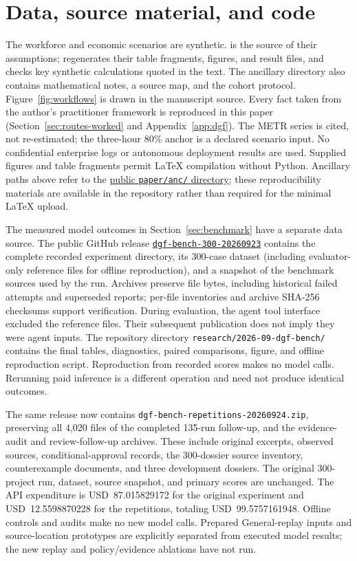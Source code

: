 \section*{Data, source material, and code}

The workforce and economic scenarios are synthetic.  is the source of their assumptions;
 regenerates their table fragments, figures, and result files, and
 checks key synthetic calculations quoted in the text. The ancillary directory also contains
mathematical notes, a source map, and the cohort protocol. Figure~\ref{fig:workflows} is drawn in the
manuscript source. Every fact taken from the author's practitioner framework is reproduced in this paper
(Section~\ref{sec:routes-worked} and Appendix~\ref{app:dgf}). The METR series is cited, not re-estimated; the three-hour 80\% anchor is a declared scenario
input. No confidential enterprise logs or autonomous deployment results are used. Supplied figures and
table fragments permit \LaTeX{} compilation without Python.
Ancillary paths above refer to the
\href{https://github.com/jeremy1392/dgf-agentic-bench/tree/main/paper/anc}{public \texttt{paper/anc/} directory}; these reproducibility
materials are available in the repository rather than required for the minimal \LaTeX{} upload.

The measured model outcomes in Section~\ref{sec:benchmark} have a separate data source.
The public GitHub release
\href{https://github.com/jeremy1392/dgf-agentic-bench/releases/tag/dgf-bench-300-20260923}{\texttt{dgf-bench-300-20260923}}
contains the complete recorded experiment directory, its 300-case dataset (including evaluator-only
reference files for offline reproduction), and a snapshot of the benchmark sources used by the run.
Archives preserve file bytes, including historical failed attempts and superseded reports; per-file
inventories and archive SHA-256 checksums support verification. During evaluation, the agent tool
interface excluded the reference files. Their subsequent publication does not imply they were agent inputs.
The repository directory \nolinkurl{research/2026-09-dgf-bench/} contains the final tables, diagnostics,
paired comparisons, figure, and offline reproduction script. Reproduction from recorded scores makes
no model calls. Rerunning paid inference is a different operation and need not produce identical outcomes.

The same release now contains \texttt{dgf-bench-repetitions-20260924.zip}, preserving all
4,020 files of the completed 135-run follow-up, and the evidence-audit and review-follow-up
archives. These include original excerpts, observed sources, conditional-approval records,
the 300-dossier source inventory, counterexample documents, and three development dossiers.
The original 300-project run, dataset, source snapshot, and primary scores are unchanged.
The API expenditure is USD~87.015829172 for the original experiment and USD~12.5598870228 for
the repetitions, totaling USD~99.5757161948. Offline controls and audits make no new model calls.
Prepared General-replay inputs and source-location prototypes are explicitly separated from
executed model results; the new replay and policy/evidence ablations have not run.

